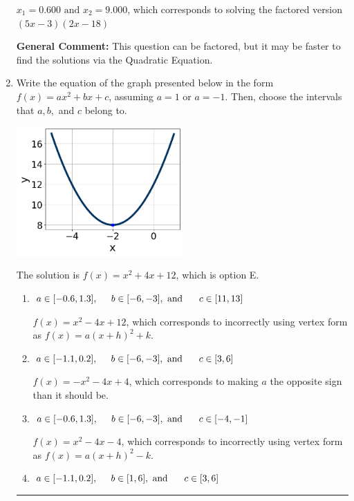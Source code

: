 \documentclass{extbook}[14pt]
\newcommand{\litem}[1]{\item #1

\rule{\textwidth}{0.4pt}}
\begin{document}
\begin{enumerate}
{\begin{enumerate}[label=\Alph*.]
$x_1 = 0.600 \text{ and } x_2 = 9.000$, which corresponds to solving the factored version $(5x -3)(2x -18)$
\end{enumerate}

\textbf{General Comment:} This question can be factored, but it may be faster to find the solutions via the Quadratic Equation.
}
\litem{
Write the equation of the graph presented below in the form $f(x)=ax^2+bx+c$, assuming  $a=1$ or $a=-1$. Then, choose the intervals that $a, b,$ and $c$ belong to.

\begin{center}
    \includegraphics[width=0.5\textwidth]{../Figures/quadraticGraphToEquationA.png}
\end{center}


The solution is \( f(x) = x^{2} +4 x + 12 \), which is option E.\begin{enumerate}[label=\Alph*.]
\item \( a \in [-0.6, 1.3], \hspace*{5mm} b \in [-6, -3], \text{ and } \hspace*{5mm} c \in [11, 13] \)

$f(x)=x^{2} -4 x + 12$, which corresponds to incorrectly using vertex form as $f(x) = a(x+h)^2+k$.
\item \( a \in [-1.1, 0.2], \hspace*{5mm} b \in [-6, -3], \text{ and } \hspace*{5mm} c \in [3, 6] \)

$f(x)=-x^{2} -4 x + 4$, which corresponds to making $a$ the opposite sign than it should be.
\item \( a \in [-0.6, 1.3], \hspace*{5mm} b \in [-6, -3], \text{ and } \hspace*{5mm} c \in [-4, -1] \)

$f(x)=x^{2} -4 x -4$, which corresponds to incorrectly using vertex form as $f(x) = a(x+h)^2 - k$.
\item \( a \in [-1.1, 0.2], \hspace*{5mm} b \in [1, 6], \text{ and } \hspace*{5mm} c \in [3, 6] \)


\end{enumerate}}
\end{enumerate}
\end{document}
